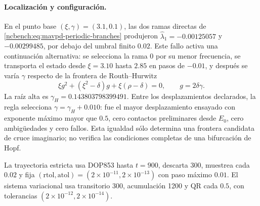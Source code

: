 \paragraph{Localización y configuración.}
En el punto base \((\xi,\gamma)=(3.1,0.1)\), las dos ramas directas de
\eqref{ncbench:eq:mavpd-periodic-branches} produjeron
\(\widehat\lambda_1=-0.00125057\) y \(-0.00299485\), por debajo del umbral
finito \(0.02\). Este fallo activa una continuación alternativa: se selecciona
la rama 0 por su menor frecuencia, se transporta el estado desde
\(\xi=3.10\) hasta \(2.85\) en pasos de \(-0.01\), y después se varía
\(\gamma\) respecto de la frontera de Routh--Hurwitz
\begin{equation}
 \xi g^2+(\xi^2-\delta)g+\xi(\rho-\delta)=0,
 \qquad g=2\delta\gamma.
 \label{ncbench:eq:mavpd-hopf-boundary}
\end{equation}
La raíz alta es \(\gamma_H=0.143803798399491\). Entre los desplazamientos
declarados, la regla selecciona \(\gamma=\gamma_H+0.010\): fue el mayor
desplazamiento ensayado con exponente máximo mayor que \(0.5\), cero contactos
preliminares desde \(E_0\), cero ambigüedades y cero fallos. Esta igualdad sólo
determina una frontera candidata de cruce imaginario; no verifica las
condiciones completas de una bifurcación de Hopf.

La trayectoria estricta usa DOP853 hasta \(t=900\), descarta 300, muestrea cada
\(0.02\) y fija \((\mathrm{rtol},\mathrm{atol})=(2\times10^{-11},
2\times10^{-13})\) con paso máximo \(0.01\). El sistema variacional usa
transitorio 300, acumulación 1200 y QR cada \(0.5\), con tolerancias
\((2\times10^{-12},2\times10^{-14})\).


